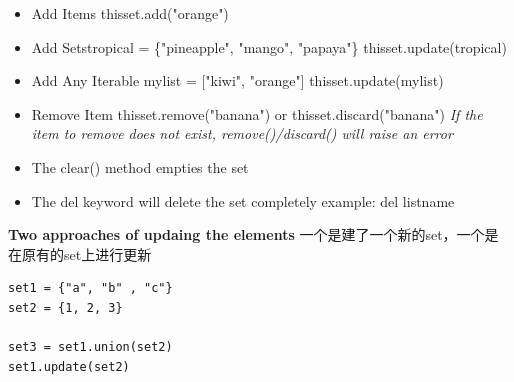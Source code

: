 \documentclass[UTF8]{article}
\begin{document}
\begin{itemize}
    \item Add Items thisset.add("orange")
    \item Add Sets\newline tropical = \{"pineapple", "mango", "papaya"\} thisset.update(tropical)

    \item Add Any Iterable \newline mylist = ["kiwi", "orange"]  thisset.update(mylist)
    \item Remove Item \newline thisset.remove("banana") or thisset.discard("banana")
          \newline \textit{If the item to remove does not exist, remove()/discard() will raise an error}
    \item The clear() method empties the set
    \item The del keyword will delete the set completely example: del listname
\end{itemize}

\textbf{Two approaches of updaing the elements}
一个是建了一个新的set，一个是在原有的set上进行更新
\begin{lstlisting}
set1 = {"a", "b" , "c"}
set2 = {1, 2, 3}

set3 = set1.union(set2)
set1.update(set2)

\end{lstlisting}
\end{document}
